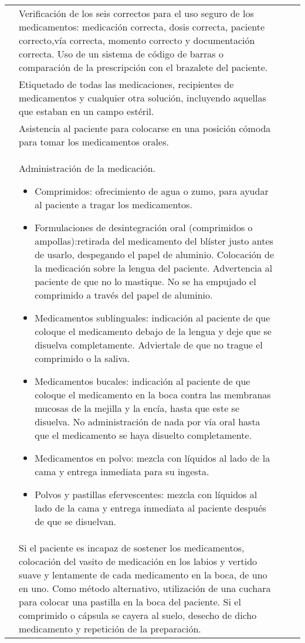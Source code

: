 \begin{landscape}
\begin{longtable}{N{0.15\textwidth}M{0.94\textwidth}|M{0.095\textwidth}M{0.22\textwidth}}
            & Verificación de los seis correctos para el uso seguro de los medicamentos: medicación correcta, dosis correcta, paciente correcto,vía correcta, momento correcto y documentación correcta. Uso de un sistema de código de barras o comparación de la prescripción con el brazalete del paciente.
            & & \\  
            & Etiquetado de todas las medicaciones, recipientes de medicamentos y cualquier otra solución, incluyendo aquellas que estaban en un campo estéril.
            & & \\  
            & Asistencia al paciente para colocarse en una posición cómoda para tomar los medicamentos orales.
            & & \\  
            & Administración de la medicación.
            \begin{itemize}[topsep=0pt, partopsep=0pt,itemsep=0pt,parsep=0pt]
                \item Comprimidos: ofrecimiento de agua o zumo, para ayudar al paciente a tragar los medicamentos.
                \item Formulaciones de desintegración oral (comprimidos o ampollas):retirada del medicamento del blíster justo antes de usarlo, despegando el papel de aluminio. Colocación de la medicación sobre la lengua del paciente. Advertencia al paciente de que no lo mastique. No se ha empujado el comprimido a través del papel de aluminio.
                \item Medicamentos sublinguales: indicación al paciente de que coloque el medicamento debajo de la lengua y deje que se disuelva completamente. Adviertale de que no trague el comprimido o la saliva.
                \item Medicamentos bucales: indicación al paciente de que coloque el medicamento en la boca contra las membranas mucosas de la mejilla y la encía, hasta que este se disuelva. No administración de nada por vía oral hasta que el medicamento se haya disuelto completamente.
                \item Medicamentos en polvo: mezcla con líquidos al lado de la cama y entrega inmediata para su ingesta.
                \item Polvos y pastillas efervescentes: mezcla con líquidos al lado de la cama y entrega inmediata al paciente después de que se disuelvan.
            \end{itemize}
            & & \\  
            & Si el paciente es incapaz de sostener los medicamentos, colocación del vasito de medicación en los labios y vertido suave y lentamente de cada medicamento en la boca, de uno en uno. Como método alternativo, utilización de una cuchara para colocar una pastilla en la boca del paciente. Si el comprimido o cápsula se cayera al suelo, desecho de dicho medicamento y repetición de la preparación.

\end{longtable}
\end{landscape}
